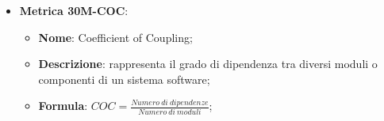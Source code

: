 \begin{itemize}
    \item \textbf{Metrica 30M-COC}:
    \begin{itemize}
        \item \textbf{Nome}: Coefficient of Coupling;
        \item \textbf{Descrizione}: rappresenta il grado di dipendenza tra diversi moduli o componenti di un sistema software;
        \item \textbf{Formula}: $COC = \frac{Numero\: di\: dipendenze}{Numero\: di\: moduli}$;
    \end{itemize}
\end{itemize}